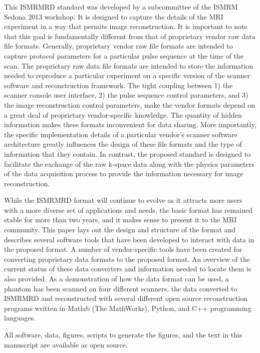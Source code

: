 \documentclass[12pt]{article}
\begin{document}
This ISMRMRD standard was developed by a subcommittee of the ISMRM Sedona 2013 workshop.  It is designed to capture the details of the MRI experiment in a way that permits image reconstruction.  It is important to note that this goal is fundamentally different from that of proprietary vendor raw data file formats.  Generally, proprietary vendor raw file formats are intended to capture protocol parameters for a particular pulse sequence at the time of the scan.  The proprietary raw data file formats are intended to store the information needed to reproduce a particular experiment on a specific version of the scanner software and reconstruction framework.  The tight coupling between 1) the scanner console user interface, 2) the pulse sequence control parameters, and 3) the image reconstruction control parameters, make the vendor formats depend on a great deal of proprietary vendor-specific knowledge. The quantity of hidden information makes these formats inconvenient for data sharing.  More importantly, the specific implementation details of a particular vendor's scanner software architecture greatly influences the design of these file formats and the type of information that they contain.  In contrast, the proposed standard is designed to facilitate the exchange of the raw k-space data along with the physics parameters of the data acquisition process to provide the information necessary for image reconstruction.

While the ISMRMRD format will continue to evolve as it attracts more users with a more diverse set of applications and needs, the basic format has remained stable for more than two years, and it makes sense to present it to the MRI community. This paper lays out the design and structure of the format and describes several software tools that have been developed to interact with data in the proposed format. A number of vendor-specific tools have been created for converting proprietary data formats to the proposed format. An overview of the current status of these data converters and information needed to locate them is also provided. As a demonstration of how the data format can be used, a phantom has been scanned on four different scanners, the data converted to ISMRMRD and reconstructed with several different open source reconstruction programs written in Matlab (The MathWorks), Python, and C++ programming languages. 

All software, data, figures, scripts to generate the figures, and the text in this manuscript are available as open source. 
\end{document}
